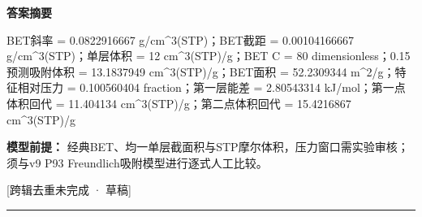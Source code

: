 \documentclass[UTF8,11pt,a4paper]{ctexart}
\begin{document}
\noindent\textbf{答案摘要}\par
BET斜率 = 0.0822916667 g/cm\textasciicircum{}3(STP)；BET截距 = 0.00104166667 g/cm\textasciicircum{}3(STP)；单层体积 = 12 cm\textasciicircum{}3(STP)/g；BET C = 80 dimensionless；0.15预测吸附体积 = 13.1837949 cm\textasciicircum{}3(STP)/g；BET面积 = 52.2309344 m\textasciicircum{}2/g；特征相对压力 = 0.100560404 fraction；第一层能差 = 2.80543314 kJ/mol；第一点体积回代 = 11.404134 cm\textasciicircum{}3(STP)/g；第二点体积回代 = 15.4216867 cm\textasciicircum{}3(STP)/g\par
\noindent\textbf{模型前提：}
经典BET、均一单层截面积与STP摩尔体积，压力窗口需实验审核；须与v9 P93 Freundlich吸附模型进行逐式人工比较。\par
\noindent\textcolor{red!65!black}{[跨辑去重未完成 · 草稿]} \par
\medskip\hrule\medskip
{}
\end{document}
